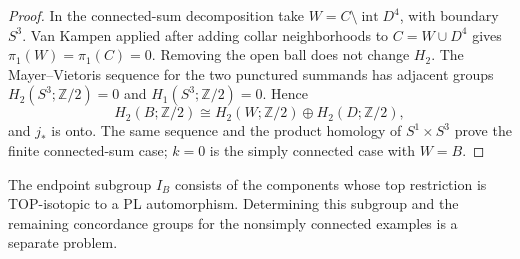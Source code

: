 \begin{proof}
In the connected-sum decomposition take
$W=C\setminus\operatorname{int}D^4$, with boundary $S^3$.
Van Kampen applied after adding collar neighborhoods to
$C=W\cup D^4$ gives $\pi_1(W)=\pi_1(C)=0$.
Removing the open ball does not change $H_2$.
The Mayer--Vietoris sequence for the two punctured summands
has adjacent groups $H_2(S^3;\mathbb Z/2)=0$ and
$H_1(S^3;\mathbb Z/2)=0$. Hence
\[
 H_2(B;\mathbb Z/2)\cong H_2(W;\mathbb Z/2)
                                 \oplus H_2(D;\mathbb Z/2),
\]
and $j_*$ is onto. The same sequence and the product homology
of $S^1\times S^3$ prove the finite connected-sum case;
$k=0$ is the simply connected case with $W=B$.
\end{proof}

The endpoint subgroup $I_B$ consists of the components whose top
restriction is TOP-isotopic to a PL automorphism. Determining this
subgroup and the remaining concordance groups for the nonsimply
connected examples is a separate problem.
